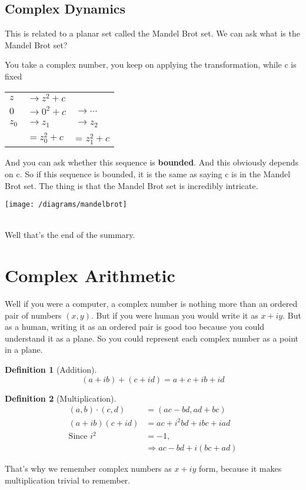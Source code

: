 \documentclass{article}
\newtheorem{definition}{Definition}[section]
\begin{document}
\subsection{Complex Dynamics}
This is related to a planar set called the Mandel Brot set. We can ask what is the Mandel Brot set?

\noindent You take a complex number, you keep on applying the transformation, while c is fixed
\begin{center}
	\begin{tabular}{lll}
		$z$   & $\rightarrow z^{2} + c$  &                      \\
		$0$   & $\rightarrow 0^{2} + c $ & $\rightarrow \cdots$ \\
		$z_0$ & $\rightarrow z_1$        & $\rightarrow z_2$    \\
		      & $= z_0^2 + c$            & = $z_1^2 + c$        \\
	\end{tabular}
\end{center}
And you can ask whether this sequence is \textbf{bounded}. And this obviously depends on c.
So if this sequence is bounded, it is the same as saying c is in the Mandel Brot set. The thing is
that the Mandel Brot set is incredibly intricate.
\begin{center}
	\texttt{[image: /diagrams/mandelbrot]}
\end{center}

\noindent \\ Well that's the end of the summary.

\section{Complex Arithmetic}
Well if you were a computer, a complex number is nothing more than an ordered pair of numbers $(x,y)$. But
if you were human you would write it as $x + iy$. But as a human, writing it as an ordered pair
is good too because you could understand it as a plane. So you could represent each complex number
as a point in a plane.
\begin{definition}[Addition]
	\begin{displaymath}
		(a + ib) + (c+id) = a+c+ib+id
	\end{displaymath}
\end{definition}
\begin{definition}[Multiplication]
	\begin{align*}
		(a,b)  \cdot (c,d)  & = (ac-bd, ad+bc)             \\
		(a + ib) (c + id)   & = ac + i^{2}bd + ibc + iad   \\
		\text{Since } i^{2} & = -1,                        \\
		                    & \Rightarrow ac-bd + i(bc+ad)
	\end{align*}
\end{definition}
\noindent That's why we remember complex numbers as $x+iy$ form, because
it makes multiplication trivial to remember.
\end{document}
